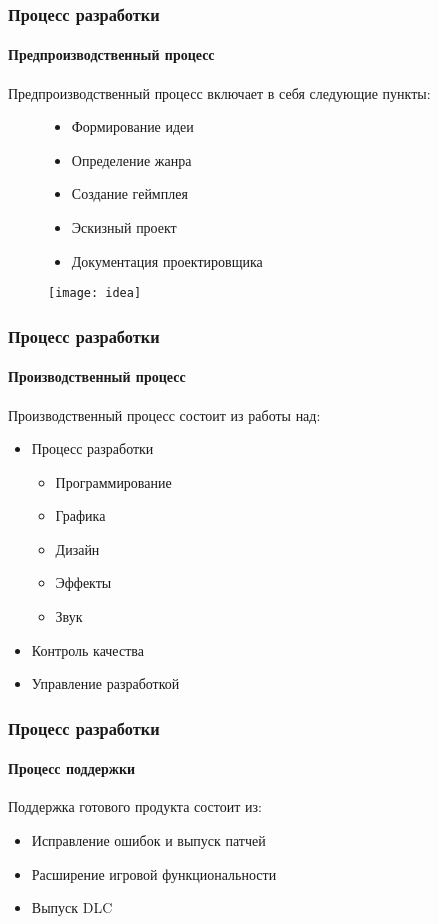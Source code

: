 \begin{frame}
    \frametitle{Процесс разработки}
    \framesubtitle{Предпроизводственный процесс}
    Предпроизводственный процесс включает в себя следующие пункты:
    \begin{figure}
        \begin{minipage}{0.47\textwidth}
            \begin{itemize}
                \item Формирование идеи
                \item Определение жанра
                \item Создание геймплея
                \item Эскизный проект
                \item Документация проектировщика
            \end{itemize}
        \end{minipage}
        \begin{minipage}{0.5\textwidth1}
            \texttt{[image: idea]}
        \end{minipage}
    \end{figure}
\end{frame}

\begin{frame}
    \frametitle{Процесс разработки}
    \framesubtitle{Производственный процесс}
    Производственный процесс состоит из работы над:
    \begin{itemize}
        \item Процесс разработки
        \begin{itemize}
            \item Программирование
            \item Графика
            \item Дизайн
            \item Эффекты
            \item Звук
        \end{itemize}
        \item Контроль качества
        \item Управление разработкой
    \end{itemize}
\end{frame}

\begin{frame}
    \frametitle{Процесс разработки}
    \framesubtitle{Процесс поддержки}
    Поддержка готового продукта состоит из:
    \begin{itemize}
        \item Исправление ошибок и выпуск патчей
        \item Расширение игровой функциональности
        \item Выпуск DLC
    \end{itemize}
\end{frame}

